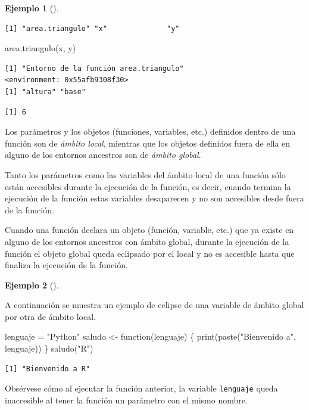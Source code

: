 \documentclass[
  a4paper,
]{scrreport}
\newenvironment{Shaded}{\begin{snugshade}}{\end{snugshade}}
\newcommand{\ControlFlowTok}[1]{\textcolor[rgb]{0.00,0.23,0.31}{#1}}
\newcommand{\FunctionTok}[1]{\textcolor[rgb]{0.28,0.35,0.67}{#1}}
\newcommand{\NormalTok}[1]{\textcolor[rgb]{0.00,0.23,0.31}{#1}}
\newcommand{\OtherTok}[1]{\textcolor[rgb]{0.00,0.23,0.31}{#1}}
\newcommand{\StringTok}[1]{\textcolor[rgb]{0.13,0.47,0.30}{#1}}
\theoremstyle{definition}
\theoremstyle{definition}
\newtheorem{example}{Ejemplo}[chapter]
\theoremstyle{remark}
\begin{document}
\begin{example}[]
\begin{verbatim}
[1] "area.triangulo" "x"              "y"             
\end{verbatim}

\begin{Shaded}
\begin{Highlighting}[]
\FunctionTok{area.triangulo}\NormalTok{(x, y)}
\end{Highlighting}
\end{Shaded}

\begin{verbatim}
[1] "Entorno de la función area.triangulo"
<environment: 0x55afb9308f30>
[1] "altura" "base"  
\end{verbatim}

\begin{verbatim}
[1] 6
\end{verbatim}

\end{example}

Los parámetros y los objetos (funciones, variables, etc.) definidos
dentro de una función son de \emph{ámbito local}, mientras que los
objetos definidos fuera de ella en alguno de los entornos ancestros son
de \emph{ámbito global}.

Tanto los parámetros como las variables del ámbito local de una función
sólo están accesibles durante la ejecución de la función, es decir,
cuando termina la ejecución de la función estas variables desaparecen y
no son accesibles desde fuera de la función.

Cuando una función declara un objeto (función, variable, etc.) que ya
existe en alguno de los entornos ancestros con ámbito global, durante la
ejecución de la función el objeto global queda eclipsado por el local y
no es accesible hasta que finaliza la ejecución de la función.

\leavevmode{}%
\begin{example}[]\label{exm-eclise-variables-globales-por-locales}

A continuación se muestra un ejemplo de eclipse de una variable de
ámbito global por otra de ámbito local.

\begin{Shaded}
\begin{Highlighting}[]
\NormalTok{lenguaje }\OtherTok{=} \StringTok{"Python"}
\NormalTok{saludo }\OtherTok{\textless{}{-}} \ControlFlowTok{function}\NormalTok{(lenguaje) \{}
  \FunctionTok{print}\NormalTok{(}\FunctionTok{paste}\NormalTok{(}\StringTok{"Bienvenido a"}\NormalTok{, lenguaje))  }
\NormalTok{\}}
\FunctionTok{saludo}\NormalTok{(}\StringTok{"R"}\NormalTok{)}
\end{Highlighting}
\end{Shaded}

\begin{verbatim}
[1] "Bienvenido a R"
\end{verbatim}

Obsérvese cómo al ejecutar la función anterior, la variable
\texttt{lenguaje} queda inaccesible al tener la función un parámetro con
el mismo nombre.

\end{example}
\end{document}
